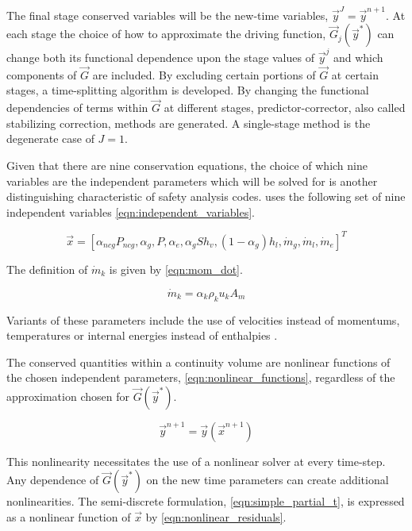 The final stage conserved variables will be the new-time variables, $\vec{y}^{J} = \vec{y}^{n+1}$. 
At each stage the choice of how to approximate the driving function, $\vec{G}_{j}(\vec{y}^{*})$ can change both its functional dependence upon the stage values of $\vec{y}^{j}$ and which components of $\vec{G}$ are included.
By excluding certain portions of $\vec{G}$ at certain stages, a time-splitting algorithm is developed.
By changing the functional dependencies of terms within $\vec{G}$ at different stages, predictor-corrector, also called stabilizing correction, methods are generated. 
A single-stage method is the degenerate case of $J = 1$.

Given that there are nine conservation equations, the choice of which nine variables are the independent parameters which will be solved for is another distinguishing characteristic of safety analysis codes.
\cobra uses the following set of nine independent variables \eqref{eqn:independent_variables}.

\begin{equation}
\label{eqn:independent_variables}
\vec{x} = [\alpha_{ncg}P_{ncg}, \alpha_g, P, \alpha_e, \alpha_gS h_v, (1 - \alpha_g) h_l, \dot{m}_g, \dot{m}_l, \dot{m}_e]^{T}
\end{equation}

The definition of $\dot{m}_k$ is given by \eqref{eqn:mom_dot}.

\begin{equation}
\label{eqn:mom_dot}
\dot{m}_k = \alpha_k \rho_k u_k A_m
\end{equation}

Variants of these parameters include the use of velocities instead of momentums, temperatures or internal energies instead of enthalpies \cite{RELAP, TRACE}.

The conserved quantities within a continuity volume are nonlinear functions of the chosen independent parameters, \eqref{eqn:nonlinear_functions}, regardless of the approximation chosen for $\vec{G}(\vec{y}^{*})$.

\begin{equation}
\label{eqn:nonlinear_functions}
\vec{y}^{n+1} = \vec{y}(\vec{x}^{n+1})
\end{equation}

This nonlinearity necessitates the use of a nonlinear solver at every time-step.
Any dependence of $\vec{G}(\vec{y}^{*})$ on the new time parameters can create additional nonlinearities.
The semi-discrete formulation, \eqref{eqn:simple_partial_t}, is expressed as a nonlinear function of $\vec{x}$ by \eqref{eqn:nonlinear_residuals}.

